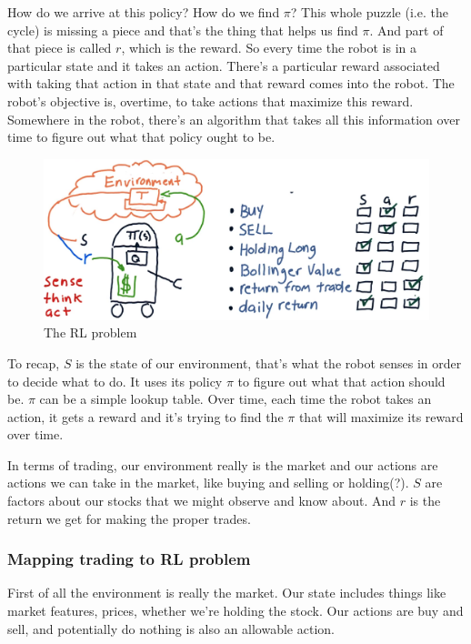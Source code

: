 \documentclass[12pt]{article}
\begin{document}
How do we arrive at this policy? How do we find $\pi$? This whole puzzle (i.e. the cycle) is missing a piece and that's the thing that helps us find $\pi$. And part of that piece is called $r$, which is the reward. So every time the robot is in a particular state and it takes an action. There's a particular reward associated with taking that action in that state and that reward comes into the robot. The robot's objective is, overtime, to take actions that maximize this reward. Somewhere in the robot, there's an algorithm that takes all this information over time to figure out what that policy ought to be.  

\begin{figure}[!ht]
\centering
\includegraphics[scale=0.35]{fig/fig98}
\caption{The RL problem}
\end{figure}

To recap, $S$ is the state of our environment, that's what the robot senses in order to decide what to do. It uses its policy $\pi$ to figure out what that action should be. $\pi$ can be a simple lookup table. Over time, each time the robot takes an action, it gets a reward and it's trying to find the $\pi$ that will maximize its reward over time. 

In terms of trading, our environment really is the market and our actions are actions we can take in the market, like buying and selling or holding(?). $S$ are factors about our stocks that we might observe and know about. And $r$ is the return we get for making the proper trades.

\subsubsection{Mapping trading to RL problem}

First of all the environment is really the market. Our state includes things like market features, prices, whether we're holding the stock. Our actions are buy and sell, and potentially do nothing is also an allowable action. 
\end{document}
